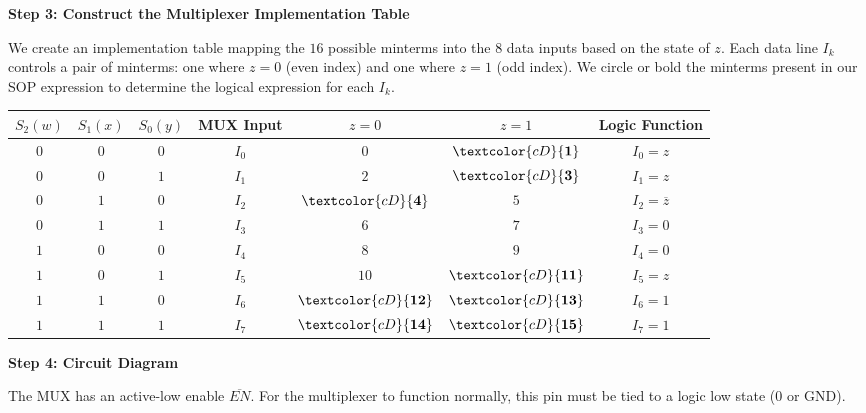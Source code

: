\documentclass[12pt,a3paper]{article}
\begin{document}
\begin{enumerate}
\begin{tcolorbox}[enhanced,breakable,ansbox,colback=cD!4,colframe=cD,boxrule=0.8pt,arc=5pt,title={\textbf{Answer}},fonttitle=\bfseries\color{white},colbacktitle=cD]
\textbf{Step 3: Construct the Multiplexer Implementation Table}

We create an implementation table mapping the $16$ possible minterms into the $8$ data inputs based on the state of $z$. Each data line $I_k$ controls a pair of minterms: one where $z=0$ (even index) and one where $z=1$ (odd index). We circle or bold the minterms present in our SOP expression to determine the logical expression for each $I_k$.

\begin{center}
\renewcommand{\arraystretch}{1.2}
\begin{tabular}{ccc|c|cc|c}
\toprule
$S_2 (w)$ & $S_1 (x)$ & $S_0 (y)$ & MUX Input & $z = 0$ & $z = 1$ & Logic Function \\
\midrule
$0$ & $0$ & $0$ & $I_0$ & $0$ & $\textcolor{cD}{\mathbf{1}}$ & $I_0 = z$ \\
$0$ & $0$ & $1$ & $I_1$ & $2$ & $\textcolor{cD}{\mathbf{3}}$ & $I_1 = z$ \\
$0$ & $1$ & $0$ & $I_2$ & $\textcolor{cD}{\mathbf{4}}$ & $5$ & $I_2 = \overline{z}$ \\
$0$ & $1$ & $1$ & $I_3$ & $6$ & $7$ & $I_3 = 0$ \\
$1$ & $0$ & $0$ & $I_4$ & $8$ & $9$ & $I_4 = 0$ \\
$1$ & $0$ & $1$ & $I_5$ & $10$ & $\textcolor{cD}{\mathbf{11}}$ & $I_5 = z$ \\
$1$ & $1$ & $0$ & $I_6$ & $\textcolor{cD}{\mathbf{12}}$ & $\textcolor{cD}{\mathbf{13}}$ & $I_6 = 1$ \\
$1$ & $1$ & $1$ & $I_7$ & $\textcolor{cD}{\mathbf{14}}$ & $\textcolor{cD}{\mathbf{15}}$ & $I_7 = 1$ \\
\bottomrule
\end{tabular}
\end{center}

\textbf{Step 4: Circuit Diagram}

The MUX has an active-low enable $\overline{EN}$. For the multiplexer to function normally, this pin must be tied to a logic low state ($0$ or GND). 

\vspace{0.5cm}
\begin{center}
\end{center}
\end{tcolorbox}
\end{enumerate}
\end{document}
